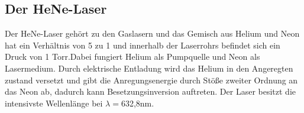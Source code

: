 \subsection{Der HeNe-Laser}
Der HeNe-Laser gehört zu den Gaslasern und das Gemisch aus Helium und Neon hat ein Verhältnis von 5 zu 1 und innerhalb der Laserrohrs befindet sich ein Druck von 1 Torr.Dabei fungiert Helium als Pumpquelle und Neon als Lasermedium. Durch elektrische Entladung wird das Helium in den Angeregten zustand versetzt und gibt die Anregungsenergie durch Stöße zweiter Ordnung an das Neon ab, dadurch kann Besetzungsinversion auftreten. Der Laser besitzt die intensivste Wellenlänge bei $\lambda=$632,8nm.